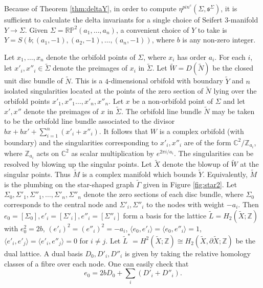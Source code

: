 \documentclass{amsart}
\theoremstyle{definition}
\theoremstyle{remark}
\numberwithin{equation}{section}
\begin{document}
Because of Theorem \ref{thm:deltaY}, in order to compute $\eta^{pin^c}(\Sigma , \mathfrak{s}^\Sigma)$, it is sufficient to calculate the delta invariants for a single choice of Seifert $3$-manifold $Y \to \Sigma$. Given $\Sigma = \mathbb{RP}^2(a_1, \dots , a_n)$, a convenient choice of $Y$ to take is $Y = S( b ; (a_1 , -1) , (a_2, -1) , \dots , (a_n,-1) )$, where $b$ is any non-zero integer. 

Let $x_1, \dots , x_n$ denote the orbifold points of $\Sigma$, where $x_i$ has order $a_i$. For each $i$, let $x'_i , x''_i \in \widetilde{\Sigma}$ denote the preimages of $x_i$ in $\widetilde{\Sigma}$. Let $\widetilde{W} = D(\widetilde{N})$ be the closed unit disc bundle of $\widetilde{N}$. This is a $4$-dimensional orbifold with boundary $\widetilde{Y}$ and $n$ isolated singularities located at the points of the zero section of $\widetilde{N}$ lying over the orbifold points $x'_1, x''_1 \dots , x'_n, x''_n$. Let $x$ be a non-orbifold point of $\Sigma$ and let $x',x''$ denote the preimages of $x$ in $\widetilde{\Sigma}$. The orbifold line bundle $\widetilde{N}$ may be taken to be the orbifold line bundle associated to the divisor $bx + bx' + \sum_{i=1}^n (x'_i + x''_i)$. It follows that $W$ is a complex orbifold (with boundary) and the singularities corresponding to $x'_i, x''_i$ are of the form $\mathbb{C}^2/\mathbb{Z}_{a_i}$, where $\mathbb{Z}_{a_i}$ acts on $\mathbb{C}^2$ as scalar multiplication by $e^{2\pi i/a_i}$. The singularities can be resolved by blowing up the singular points. Let $\widetilde{X}$ denote the blowup of $\widetilde{W}$ at the singular points. Thus $\widetilde{M}$ is a complex manifold which bounds $\widetilde{Y}$. Equivalently, $\widetilde{M}$ is the plumbing on the star-shaped graph $\widetilde{\Gamma}$ given in Figure \ref{fig:star2}. Let $\Sigma_0, \Sigma'_1, \Sigma''_1, \dots , \Sigma'_n , \Sigma''_n$ denote the zero sections of each disc bundle, where $\Sigma_0$ corresponds to the central node and $\Sigma'_i, \Sigma''_i$ to the nodes with weight $-a_i$. Then $e_0 = [\Sigma_0], e'_i = [\Sigma'_i], e''_i = [\Sigma''_i]$ form a basis for the lattice $\widetilde{L} = H_2(\widetilde{X} ; \mathbb{Z})$ with $e_0^2 = 2b$, $(e'_i)^2 = (e''_i)^2 = -a_i$, $\langle e_0  ,e'_i \rangle = \langle e_0 , e''_i \rangle = 1$, $\langle e'_i , e'_j \rangle = \langle e'_i , e''_j \rangle = 0$ for $i \neq j$. Let $\widetilde{L}^* = H^2(\widetilde{X} ; \mathbb{Z}) \cong H_2(\widetilde{X} , \partial \widetilde{X} ; \mathbb{Z})$ be the dual lattice. A dual basis $D_0, D'_i , D''_i$ is given by taking the relative homology classes of a fibre over each node. One can easily check that 
\begin{equation}\label{equ:e0}
e_0 = 2 b D_0 + \sum_i (D'_i + D''_i).
\end{equation}
\end{document}
